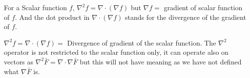 For a Scalar function $f$, $\nabla^2f = \nabla \cdot (\nabla f)$ but $\nabla f =$ gradient of scalar function of $f$. And the dot product in $\nabla \cdot (\nabla f) $ stands for the divergence of the gradient of $f$.

$\nabla^2 f= \nabla \cdot (\nabla f) =$ Divergence of gradient of the scalar function. The $\nabla^2 $ operator is not restricted to the scalar function only, it can operate also on vectors as $\nabla^2 \bar{F} = \nabla \cdot \nabla \bar{F}$ but this will not have meaning as we have not defined what $\nabla \bar{F}$ is.


